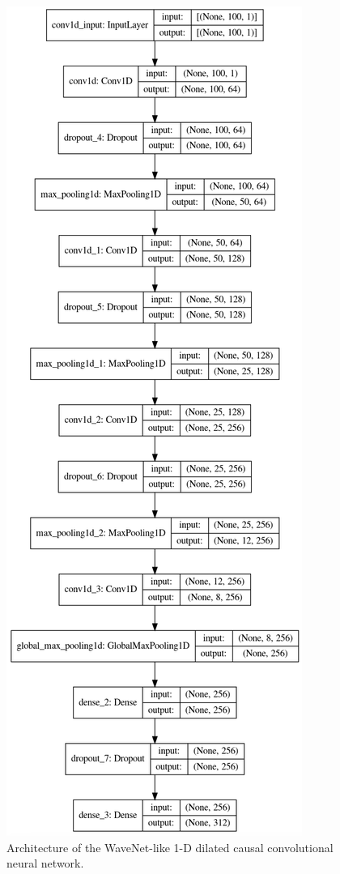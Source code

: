 \documentclass[sigconf,authorversion]{acmart}
\begin{document}
\begin{figure}[h]
  \centering
  \includegraphics[width=0.7\linewidth]{wavenet_model.png}
  \caption{Architecture of the WaveNet-like 1-D dilated causal convolutional neural network.}
  \label{wavenet_model}
\end{figure}
\end{document}
